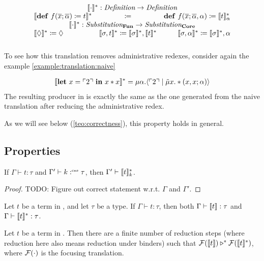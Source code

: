 \[\begin{array}{rcl rcl}
    \\
    \multicolumn{6}{c}{\translatestar{\cdot}{} : \emph{Definition} \rightarrow \emph{Definition}}\\
    \multicolumn{2}{r}{\translatestar{\defi{f(\overline{x}; \overline{\alpha})}{t}}{}} & \multicolumn{2}{c}{\coloneq} & \multicolumn{2}{l}{\defi{f(\overline{x}; \overline{\alpha}, \alpha)}{\translatestar{t}{\alpha}}} 
    \\
    \multicolumn{6}{c}{\translatestar{\cdot{}}{}{}:\emph{Substitution}_{\surfacelang{}}\rightarrow\emph{Substitution}_{\targetlang{}}}\\
    \multicolumn{2}{l}{\translatestar{\nil}{} \coloneq \nil} & 
    \multicolumn{2}{c}{\translatestar{\sigma,t}{} \coloneq \translatestar{\sigma}{},\translatestar{t}{}} &
    \multicolumn{2}{r}{\translatestar{\sigma,\alpha}{} \coloneq \translatestar{\sigma}{},\alpha}\\
    \\
  \end{array}
\]
To see how this translation removes administrative redexes, consider again the example \cref{example:translation:naive}
\begin{example}
  \begin{align*}
    \llbracket \mathbf{let}\ x = \ulcorner 2 \urcorner\ \mathbf{in}\ x*x \rrbracket^* = \mu\alpha.\langle \ulcorner 2 \urcorner \mid \tilde\mu x.*(x,x;\alpha) \rangle
  \end{align*}
  The resulting producer in \targetlang{} is exactly the same as the one generated from the naive translation after reducing the administrative redex.
\end{example}
As we will see below (\cref{teo:correctness}), this property holds in general.

\subsection{Properties}
\label{subsec:translation:properties}

\begin{lemma}
  If $\Gamma \vdash t : \tau$ and $\Gamma' \vdash k :^{\text{\tiny cns}} \tau$, then $\Gamma' \vdash \llbracket t \rrbracket_{k}^{\ast}$.
\end{lemma}
\begin{proof}
  TODO: Figure out correct statement w.r.t. $\Gamma$ and $\Gamma'$.
\end{proof}

\begin{theorem}
  Let $t$ be a term in \surfacelang, and let $\tau$ be a type.
  If $\Gamma \vdash t: \tau$, then both $\Gamma \vdash \llbracket t \rrbracket : \tau$ and $\Gamma \vdash \llbracket t \rrbracket_{}^{\ast} : \tau$.
\end{theorem}

\begin{theorem}[Correctness]
  \label{teo:correctness}
  Let $t$ be a term in \surfacelang. Then there are a finite number of reduction steps (where reduction here also means reduction under binders) such that $\mathcal{F}(\llbracket t \rrbracket) \triangleright^{\ast} \mathcal{F}(\llbracket t \rrbracket_{}^{\ast})$, where $\mathcal{F}(\cdot)$ is the focusing translation.
\end{theorem}
